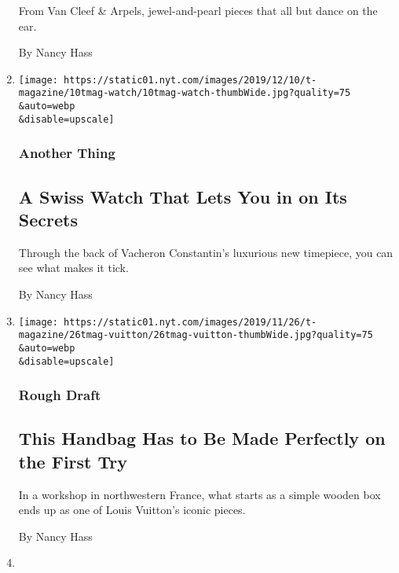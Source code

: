 \begin{enumerate}
  From Van Cleef \& Arpels, jewel-and-pearl pieces that all but dance on
  the ear.

  By Nancy Hass
\item
  \href{/2019/12/10/t-magazine/vacheron-constantin-watch.html}{}

  \texttt{[image: https://static01.nyt.com/images/2019/12/10/t-magazine/10tmag-watch/10tmag-watch-thumbWide.jpg?quality=75\\\&auto=webp\\\&disable=upscale]}

  \hypertarget{another-thing-1}{%
  \subsubsection{Another Thing}\label{another-thing-1}}

  \hypertarget{a-swiss-watch-that-lets-you-in-on-its-secrets}{%
  \subsection{A Swiss Watch That Lets You in on Its
  Secrets}\label{a-swiss-watch-that-lets-you-in-on-its-secrets}}

  Through the back of Vacheron Constantin's luxurious new timepiece, you
  can see what makes it tick.

  By Nancy Hass
\item
  \href{/2019/11/26/t-magazine/louis-vuitton-petite-malle.html}{}

  \texttt{[image: https://static01.nyt.com/images/2019/11/26/t-magazine/26tmag-vuitton/26tmag-vuitton-thumbWide.jpg?quality=75\\\&auto=webp\\\&disable=upscale]}

  \hypertarget{rough-draft}{%
  \subsubsection{Rough Draft}\label{rough-draft}}

  \hypertarget{this-handbag-has-to-be-made-perfectly-on-the-first-try}{%
  \subsection{This Handbag Has to Be Made Perfectly on the First
  Try}\label{this-handbag-has-to-be-made-perfectly-on-the-first-try}}

  In a workshop in northwestern France, what starts as a simple wooden
  box ends up as one of Louis Vuitton's iconic pieces.

  By Nancy Hass
\item
  \href{/2019/11/25/t-magazine/tiffany-cocktail-necklace.html}{}


\end{enumerate}
